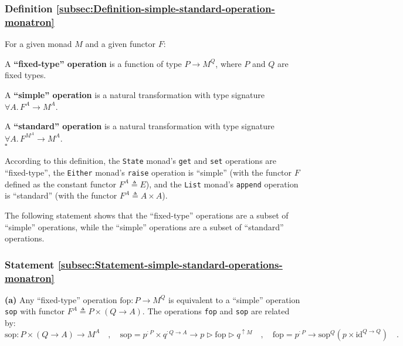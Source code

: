 \subsubsection{Definition \label{subsec:Definition-simple-standard-operation-monatron}\ref{subsec:Definition-simple-standard-operation-monatron}}

For a given monad $M$ and a given functor $F$:

A \textbf{\textsf{``}fixed-type\textsf{''} operation} is a function of type $P\rightarrow M^{Q}$,
where $P$ and $Q$ are fixed types.

A \textbf{\textsf{``}simple\textsf{''} operation} is a natural transformation with
type signature $\forall A.\,F^{A}\rightarrow M^{A}$.

A \textbf{\textsf{``}standard\textsf{''} operation} is a natural transformation with
type signature $\forall A.\,F^{M^{A}}\rightarrow M^{A}$.\\
$\square$

According to this definition, the \lstinline!State! monad\textsf{'}s \lstinline!get!
and \lstinline!set! operations are \textsf{``}fixed-type\textsf{''}, the \lstinline!Either!
monad\textsf{'}s \lstinline!raise! operation is \textsf{``}simple\textsf{''} (with the functor
$F$ defined as the constant functor $F^{A}\triangleq E$), and the
\lstinline!List! monad\textsf{'}s \lstinline!append! operation is \textsf{``}standard\textsf{''}
(with the functor $F^{A}\triangleq A\times A$). 

The following statement shows that the \textsf{``}fixed-type\textsf{''} operations
are a subset of \textsf{``}simple\textsf{''} operations, while the \textsf{``}simple\textsf{''} operations
are a subset of \textsf{``}standard\textsf{''} operations.

\subsubsection{Statement \label{subsec:Statement-simple-standard-operations-monatron}\ref{subsec:Statement-simple-standard-operations-monatron}}

\textbf{(a)} Any \textsf{``}fixed-type\textsf{''} operation $\text{fop}:P\rightarrow M^{Q}$
is  equivalent to a \textsf{``}simple\textsf{''} operation \lstinline!sop! with functor
$F^{A}\triangleq P\times\left(Q\rightarrow A\right)$. The operations
\lstinline!fop! and \lstinline!sop! are related by:
\[
\text{sop}:P\times\left(Q\rightarrow A\right)\rightarrow M^{A}\quad,\quad\text{sop}=p^{:P}\times q^{:Q\rightarrow A}\rightarrow p\triangleright\text{fop}\triangleright q^{\uparrow M}\quad,\quad\text{fop}=p^{:P}\rightarrow\text{sop}^{Q}(p\times\text{id}^{Q\rightarrow Q})\quad.
\]

